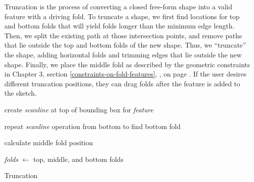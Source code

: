 Truncation is the process of converting a closed free-form shape into a
valid feature with a driving fold. To truncate a shape, we first find
locations for top and bottom folds that will yield folds longer than the
minimum edge length. Then, we split the existing path at those
intersection points, and remove paths that lie outside the top and
bottom folds of the new shape. Thus, we ``truncate'' the shape, adding
horizontal folds and trimming edges that lie outside the new shape.
Finally, we place the middle fold as described by the geometric
constraints in Chapter 3, section \ref{constraints-on-fold-features},
, on page
\pageref{geometric-constraints}. If the user desires different
truncation positions, they can drag folds after the feature is added to
the sketch.

\begin{algorithm}[H]



create \textit{scanline} at top of bounding box for \textit{feature}

 
repeat \textit{scanline} operation from bottom to find bottom fold
    
calculate middle fold position
    
\textit{folds} $\leftarrow$ top, middle, and bottom folds
    

\caption{Truncation}
\end{algorithm}

